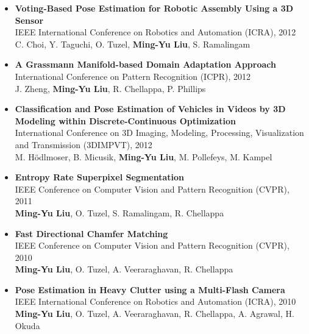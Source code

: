 \documentclass[10pt,letterpaper]{article}
\begin{document}
\begin{itemize}
\item           {\bf Voting-Based Pose Estimation for Robotic Assembly Using a 3D Sensor}\\
                IEEE International Conference on Robotics and Automation (ICRA), 2012\\
                C. Choi, Y. Taguchi, O. Tuzel, {\bf Ming-Yu Liu}, S. Ramalingam\vspace{-2mm}

\item           {\bf A Grassmann Manifold-based Domain Adaptation Approach}\\
                International Conference on Pattern Recognition (ICPR), 2012\\
                J. Zheng, {\bf Ming-Yu Liu}, R. Chellappa, P. Phillips\vspace{-2mm}

\item           {\bf Classification and Pose Estimation of Vehicles in Videos by 3D Modeling within Discrete-Continuous Optimization}\\
                International Conference on 3D Imaging, Modeling, Processing, Visualization and Transmission (3DIMPVT), 2012\\
                M. Hödlmoser, B. Micusik, {\bf Ming-Yu Liu}, M. Pollefeys, M. Kampel\vspace{-2mm}

\item           {\bf Entropy Rate Superpixel Segmentation}\\
                IEEE Conference on Computer Vision and Pattern Recognition (CVPR), 2011\\
                {\bf Ming-Yu Liu}, O. Tuzel, S. Ramalingam, R. Chellappa\vspace{-2mm}

\item           {\bf Fast Directional Chamfer Matching}\\
                IEEE Conference on Computer Vision and Pattern Recognition (CVPR), 2010\\
                {\bf Ming-Yu Liu}, O. Tuzel, A. Veeraraghavan, R. Chellappa\vspace{-2mm}

\item           {\bf Pose Estimation in Heavy Clutter using a Multi-Flash Camera}\\
                IEEE International Conference on Robotics and Automation (ICRA), 2010\\
                {\bf Ming-Yu Liu}, O. Tuzel, A. Veeraraghavan, R. Chellappa, A. Agrawal, H. Okuda
\end{itemize}
\end{document}
